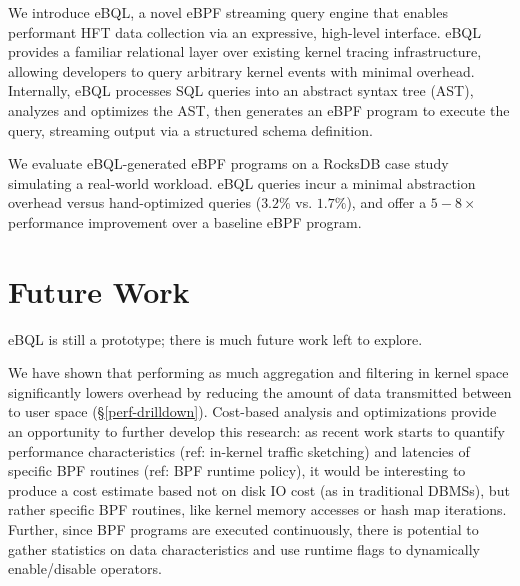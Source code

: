 \documentclass[11pt,a4paper]{article}
\begin{document}

We introduce eBQL, a novel eBPF streaming query engine that enables performant HFT data collection
via an expressive, high-level interface. eBQL provides a familiar relational layer over existing
kernel tracing infrastructure, allowing developers to query arbitrary kernel events with minimal
overhead. Internally, eBQL processes SQL queries into an abstract syntax tree (AST), analyzes and
optimizes the AST, then generates an eBPF program to execute the query, streaming output via a
structured schema definition.

We evaluate eBQL-generated eBPF programs on a RocksDB case study simulating a real-world workload.
eBQL queries incur a minimal abstraction overhead versus hand-optimized queries ($3.2\%$ vs.
$1.7\%$), and offer a $5-8\times$ performance improvement over a baseline eBPF program.

\newpage











\section{Future Work}

eBQL is still a prototype; there is much future work left to explore.

We have shown that performing as much aggregation and filtering in kernel space significantly lowers
overhead by reducing the amount of data transmitted between to user space (\S \ref{perf-drilldown}).
Cost-based analysis and optimizations provide an opportunity to further develop this research: as
recent work starts to quantify performance characteristics (ref: in-kernel traffic sketching) and
latencies of specific BPF routines (ref: BPF runtime policy), it would be interesting to produce a
cost estimate based not on disk IO cost (as in traditional DBMSs), but rather specific BPF routines,
like kernel memory accesses or hash map iterations. Further, since BPF programs are executed
continuously, there is potential to gather statistics on data characteristics and use runtime flags
to dynamically enable/disable operators.
\end{document}
